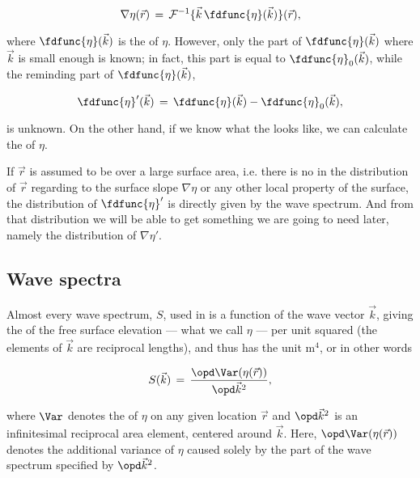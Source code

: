 {\begin{equation}
\nabla\eta(\vec{r}) \,=\, \mathcal{F}^{-1}\{\vec{k}\,\fdfunc{\eta}(\vec{k})\}(\vec{r}),
\end{equation}

where $\fdfunc{\eta}(\vec{k})$ is the  of $\eta$. However, only the part of $\fdfunc{\eta}(\vec{k})$ where $\vec{k}$ is small enough is known; in fact, this part is equal to $\fdfunc{\eta}_0(\vec{k})$, while the reminding part of $\fdfunc{\eta}(\vec{k})$,

\begin{equation}
\fdfunc{\eta}'(\vec{k}) \,=\, \fdfunc{\eta}(\vec{k}) - \fdfunc{\eta}_0(\vec{k}),
\end{equation}

is unknown. On the other hand, if we know what the  looks like, we can calculate the  of $\eta$.

If $\vec{r}$ is assumed to be  over a large surface area, i.e. there is no \bias in the distribution of $\vec{r}$ regarding to the surface slope $\nabla\eta$ or any other local property of the surface, the distribution of $\fdfunc{\eta}'$ is directly given by the wave spectrum. And from that distribution we will be able to get something we are going to need later, namely the distribution of $\nabla\eta'$.

\subsection{Wave spectra}

Almost every wave spectrum, $S$, used in  is a function of the wave vector $\vec{k}$, giving the \variance of the free surface elevation --- what we call $\eta$ --- per unit  squared (the elements of $\vec{k}$ are reciprocal lengths), and thus has the unit $\text{m}^4$, or in other words

\begin{equation} \label{eq:wave_spectrum_definition}
S(\vec{k}) \,=\, \frac{\opd \Var(\eta(\vec{r}))}{\opd\vec{k}^2},
\end{equation}

where $\Var$ denotes the \variance of $\eta$ on any given location $\vec{r}$ and $\opd\vec{k}^2$ is an infinitesimal reciprocal area element, centered around $\vec{k}$. Here, $\opd \Var(\eta(\vec{r}))$ denotes the additional variance of $\eta$ caused solely by the part of the wave spectrum specified by $\opd\vec{k}^2$.

}
